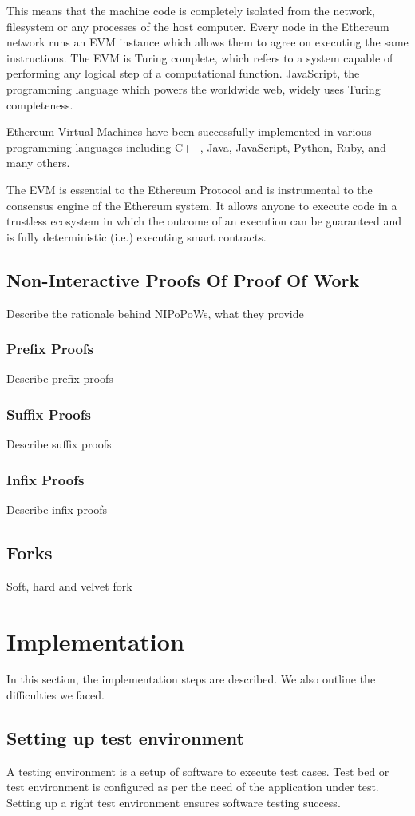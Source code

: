 \documentclass{article}
\begin{document}
This means that the machine code is completely isolated from the network, filesystem or any processes of the host computer. Every node in the Ethereum network runs an EVM instance which allows them to agree on executing the same instructions. The EVM is Turing complete, which refers to a system capable of performing any logical step of a computational function. JavaScript, the programming language which powers the worldwide web, widely uses Turing completeness.

Ethereum Virtual Machines have been successfully implemented in various programming languages including C++, Java, JavaScript, Python, Ruby, and many others.

The EVM is essential to the Ethereum Protocol and is instrumental to the consensus engine of the Ethereum system. It allows anyone to execute code in a trustless ecosystem in which the outcome of an execution can be guaranteed and is fully deterministic (i.e.) executing smart contracts.
\subsection{Non-Interactive Proofs Of Proof Of Work}
Describe the rationale behind NIPoPoWs, what they provide
\subsubsection{Prefix Proofs}
Describe prefix proofs
\subsubsection{Suffix Proofs}
Describe suffix proofs
\subsubsection{Infix Proofs}
Describe infix proofs
\subsection{Forks}
Soft, hard and velvet fork

\section{Implementation}
In this section, the implementation steps are described. We also outline the difficulties we faced.

\subsection{Setting up test environment}
A testing environment is a setup of software to execute test cases. Test bed or test environment is configured as per the need of the application under test. Setting up a right test environment ensures software testing success.
\end{document}
